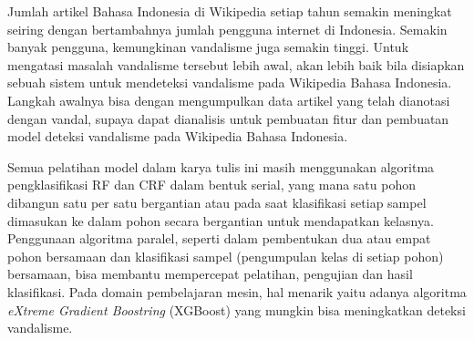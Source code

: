 Jumlah artikel Bahasa Indonesia di Wikipedia setiap tahun semakin meningkat
seiring dengan bertambahnya jumlah pengguna internet di Indonesia.
Semakin banyak pengguna, kemungkinan vandalisme juga semakin tinggi.
Untuk mengatasi masalah vandalisme tersebut lebih awal, akan lebih baik bila
disiapkan sebuah sistem untuk mendeteksi vandalisme pada Wikipedia
Bahasa Indonesia.
Langkah awalnya bisa dengan mengumpulkan data artikel yang telah dianotasi
dengan vandal, supaya dapat dianalisis untuk pembuatan fitur dan pembuatan
model deteksi vandalisme pada Wikipedia Bahasa Indonesia.

Semua pelatihan model dalam karya tulis ini masih menggunakan algoritma
pengklasifikasi RF dan CRF dalam bentuk serial, yang mana satu pohon dibangun
satu per satu bergantian atau pada saat klasifikasi setiap sampel dimasukan ke
dalam pohon secara bergantian untuk mendapatkan kelasnya.
Penggunaan algoritma paralel, seperti dalam pembentukan dua atau empat pohon
bersamaan dan klasifikasi sampel (pengumpulan kelas di setiap pohon)
bersamaan, bisa membantu mempercepat pelatihan, pengujian dan hasil
klasifikasi.
Pada domain pembelajaran mesin, hal menarik yaitu adanya algoritma
\textit{eXtreme Gradient Boostring} (XGBoost) \cite{chen2016xgboost} yang
mungkin bisa meningkatkan deteksi vandalisme.
